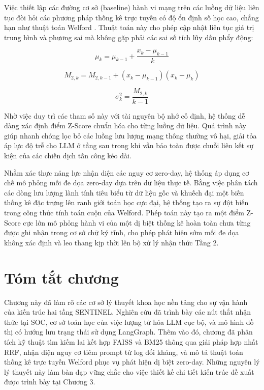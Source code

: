 Việc thiết lập các đường cơ sở (baseline) hành vi mạng trên các luồng dữ liệu liên tục đòi hỏi các phương pháp thống kê trực tuyến có độ ổn định số học cao, chẳng hạn như thuật toán Welford \cite{welford1962}. Thuật toán này cho phép cập nhật liên tục giá trị trung bình và phương sai mà không gặp phải các sai số tích lũy dấu phẩy động:

\begin{equation}
    \label{eq:welford_mean}
    \mu_k = \mu_{k-1} + \frac{x_k - \mu_{k-1}}{k}
\end{equation}

\begin{equation}
    \label{eq:welford_m2}
    M_{2,k} = M_{2,k-1} + (x_k - \mu_{k-1})(x_k - \mu_k)
\end{equation}

\begin{equation}
    \label{eq:welford_var}
    \sigma_k^2 = \frac{M_{2,k}}{k-1}
\end{equation}

Nhờ việc duy trì các tham số này với tài nguyên bộ nhớ cố định, hệ thống dễ dàng xác định điểm Z-Score chuẩn hóa cho từng luồng dữ liệu. Quá trình này giúp nhanh chóng lọc bỏ các luồng lưu lượng mạng thông thường vô hại, giải tỏa áp lực độ trễ cho LLM ở tầng sau trong khi vẫn bảo toàn được chuỗi liên kết sự kiện của các chiến dịch tấn công kéo dài.

Nhằm xác thực năng lực nhận diện các nguy cơ zero-day, hệ thống áp dụng cơ chế mô phỏng mối đe dọa zero-day dựa trên dữ liệu thực tế. Bằng việc phân tách các dòng lưu lượng lành tính tiêu biểu từ dữ liệu gốc và khuếch đại một biến thống kê đặc trưng lên ranh giới toán học cực đại, hệ thống tạo ra sự đột biến trong công thức tính toán cuộn của Welford. Phép toán này tạo ra một điểm Z-Score cực lớn mô phỏng hành vi của một dị biệt thống kê hoàn toàn chưa từng được ghi nhận trong cơ sở chữ ký tĩnh, cho phép phát hiện sớm mối đe dọa không xác định và leo thang kịp thời lên bộ xử lý nhận thức Tầng 2.

\section{Tóm tắt chương}

Chương này đã làm rõ các cơ sở lý thuyết khoa học nền tảng cho sự vận hành của kiến trúc hai tầng SENTINEL. Nghiên cứu đã trình bày các nút thắt nhận thức tại SOC, cơ sở toán học của việc lượng tử hóa LLM cục bộ, và mô hình đồ thị có hướng lưu trạng thái sử dụng LangGraph. Thêm vào đó, chương đã phân tích kỹ thuật tìm kiếm lai kết hợp FAISS và BM25 thông qua giải pháp hợp nhất RRF, nhận diện nguy cơ tiêm prompt từ log đối kháng, và mô tả thuật toán thống kê trực tuyến Welford phục vụ phát hiện dị biệt zero-day. Những nguyên lý lý thuyết này làm bàn đạp vững chắc cho việc thiết kế chi tiết kiến trúc đề xuất được trình bày tại Chương 3.

